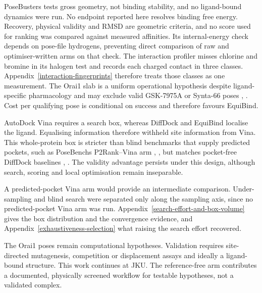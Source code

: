 PoseBusters tests gross geometry, not binding stability, and no ligand-bound dynamics were run. No endpoint reported here resolves binding free energy. Recovery, physical validity and RMSD are geometric criteria, and no score used for ranking was compared against measured affinities. Its internal-energy check depends on pose-file hydrogens, preventing direct comparison of raw and optimiser-written arms on that check. The interaction profiler misses chlorine and bromine in its halogen test and records each charged contact in three classes. Appendix~\ref{interaction-fingerprints} therefore treats those classes as one measurement. The Orai1 slab is a uniform operational hypothesis despite ligand-specific pharmacology and may exclude valid GSK-7975A or Synta-66 poses \cite{ref070}, \cite{ref071}. Cost per qualifying pose is conditional on success and therefore favours EquiBind.

AutoDock Vina requires a search box, whereas DiffDock and EquiBind localise the ligand. Equalising information therefore withheld site information from Vina. This whole-protein box is stricter than blind benchmarks that supply predicted pockets, such as PoseBench\textquotesingle s P2Rank--Vina arm \cite{ref069}, \cite{ref061}, but matches pocket-free DiffDock baselines \cite{ref024}, \cite{ref091}. The validity advantage persists under this design, although search, scoring and local optimisation remain inseparable.

A predicted-pocket Vina arm would provide an intermediate comparison. Under-sampling and blind search were separated only along the sampling axis, since no predicted-pocket Vina arm was run. Appendix~\ref{search-effort-and-box-volume} gives the box distribution and the convergence evidence, and Appendix~\ref{exhaustiveness-selection} what raising the search effort recovered.

The Orai1 poses remain computational hypotheses. Validation requires site-directed mutagenesis, competition or displacement assays and ideally a ligand-bound structure. This work continues at JKU. The reference-free arm contributes a documented, physically screened workflow for testable hypotheses, not a validated complex.
